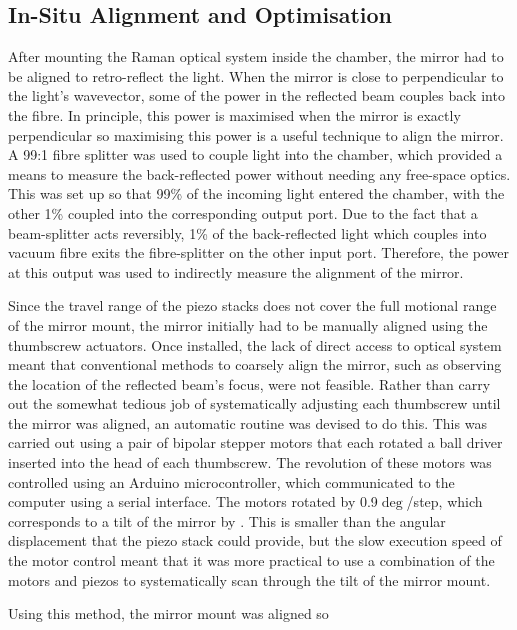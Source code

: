 \subsection{In-Situ Alignment and Optimisation} 
After mounting the Raman optical system inside the chamber, the
mirror had to be aligned to retro-reflect the light. When the mirror is close to
perpendicular to the light's wavevector, some of the power in the reflected beam
couples back into the fibre. In principle, this power is maximised when the
mirror is exactly perpendicular so maximising this power is a useful technique
to align the mirror. A 99:1 fibre splitter was used to couple light into the
chamber, which provided a means to measure the back-reflected power without
needing any free-space optics. This was set up so that 99\% of the incoming
light entered the chamber, with the other 1\% coupled into the corresponding
output port. Due to the fact that a beam-splitter acts reversibly, 1\% of the
back-reflected light which couples into vacuum fibre exits the fibre-splitter on
the other input port. Therefore, the power at this output was used to indirectly
measure the alignment of the mirror.  
\par\noindent 
Since the travel range of the piezo stacks does not cover the full motional range of the mirror mount, the
mirror initially had to be manually aligned using the thumbscrew actuators. Once
installed, the lack of direct access to optical system meant that conventional
methods to coarsely align the mirror, such as observing the location of the
reflected beam's focus, were not feasible. Rather than carry out the somewhat
tedious job of systematically adjusting each thumbscrew until the mirror was
aligned, an automatic routine was devised to do this. This was carried out using
a pair of bipolar stepper motors that each rotated a ball driver inserted into
the head of each thumbscrew. The revolution of these motors was controlled using
an Arduino microcontroller, which communicated to the computer using a serial
interface.  The motors rotated by 0.9\(\deg\)/step, which corresponds to a tilt
of the mirror by . This is smaller than the
 angular displacement that the piezo stack could
provide, but the slow execution speed of the motor control meant that it was
more practical to use a combination of the motors and piezos to systematically
scan through the tilt of the mirror mount.  %
\par\noindent 
Using this method, the mirror mount was aligned so
